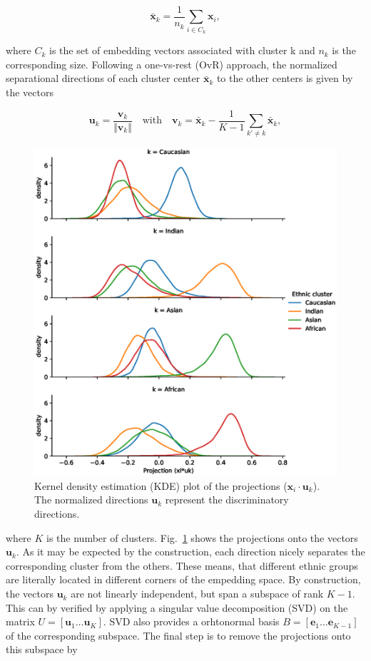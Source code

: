 \documentclass{report}
\begin{document}
\begin{equation}
\label{eq:xbar}
	\bar{\bm{x}}_k = \frac{1}{n_k}\sum_{i\in C_k}\bm{x}_i ,
\end{equation} 

\noindent where $C_k$ is the set of embedding vectors associated with cluster k and $n_k$ is the corresponding size. Following a one-vs-rest (OvR) approach, the normalized separational directions of each cluster center $\bar{\bm{x}}_k$ to the other centers is given by the vectors

\begin{equation}
\label{eq:uk}
	\bm{u}_k = \frac{\bm{v}_k}{\Vert \bm{v}_k \Vert} \quad \textrm{with} \quad \bm{v}_k = \bar{\bm{x}}_k -  \frac{1}{K-1}\sum_{k' \ne k} \bar{\bm{x}}_k,
\end{equation} 

\begin{figure}
  \includegraphics[width=\linewidth]{projection.eps}
  \caption{Kernel density estimation (KDE) plot of the projections  ($\bm{x}_i\cdot \bm{u}_k$). The normalized directions $\bm{u}_k$ represent the discriminatory directions.}
  \label{fig:projection}
\end{figure}

\noindent where $K$ is the number of clusters. Fig.~\ref{fig:projection} shows the projections onto the vectors $\bm{u}_k$. As it may be expected by the construction, each direction nicely separates the corresponding cluster from the others. These means, that different ethnic groups are literally located in different corners of the empedding space. By construction, the vectors $\bm{u}_k$ are not linearly independent, but span a subspace of rank $K-1$. This can by verified by applying a singular value decomposition (SVD) on the matrix $U=[\bm{u}_1\ldots \bm{u}_K]$. SVD also provides a orhtonormal basis $B=[\bm{e}_1\ldots \bm{e}_{K-1}]$ of the corresponding subspace. The final step is to remove the projections onto this subspace by
\end{document}
